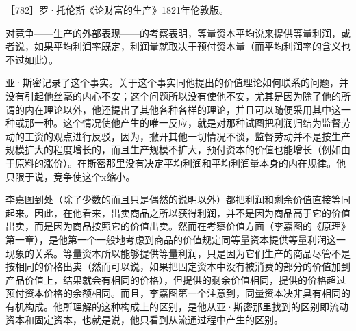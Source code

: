 


［782］罗·托伦斯《论财富的生产》1821年伦敦版。

对竞争——生产的外部表现——的考察表明，等量资本平均说来提供等量利润，或者说，如果平均利润率既定，利润量就取决于预付资本量（而平均利润率的含义也不过如此）。

亚·斯密记录了这个事实。关于这个事实同他提出的价值理论如何联系的问题，并没有引起他丝毫的内心不安；这个问题所以没有使他不安，尤其是因为除了他的所谓的内在理论以外，他还提出了其他各种各样的理论，并且可以随便采用其中这一种或那一种。这个情况使他产生的唯一反应，就是对那种试图把利润归结为监督劳动的工资的观点进行反驳，因为，撇开其他一切情况不谈，监督劳动并不是按生产规模扩大的程度增长的，而且生产规模不扩大，预付资本的价值也能增长（例如由于原料的涨价）。在斯密那里没有决定平均利润和平均利润量本身的内在规律。他只限于说，竞争使这个x缩小。

李嘉图到处（除了少数的而且只是偶然的说明以外）都把利润和剩余价值直接等同起来。因此，在他看来，出卖商品之所以获得利润，并不是因为商品高于它的价值出卖，而是因为商品按照它的价值出卖。然而在考察价值方面（李嘉图的《原理》第一章），是他第一个一般地考虑到商品的价值规定同等量资本提供等量利润这一现象的关系。等量资本所以能够提供等量利润，只是因为它们生产的商品尽管不是按相同的价格出卖（然而可以说，如果把固定资本中没有被消费的部分的价值加到产品价值上，结果就会有相同的价格），但提供的剩余价值相同，提供的价格超过预付资本价格的余额相同。而且，李嘉图第一个注意到，同量资本决非具有相同的有机构成。他所理解的这种构成上的区别，是他从亚·斯密那里找到的区别即流动资本和固定资本，也就是说，他只看到从流通过程中产生的区别。

